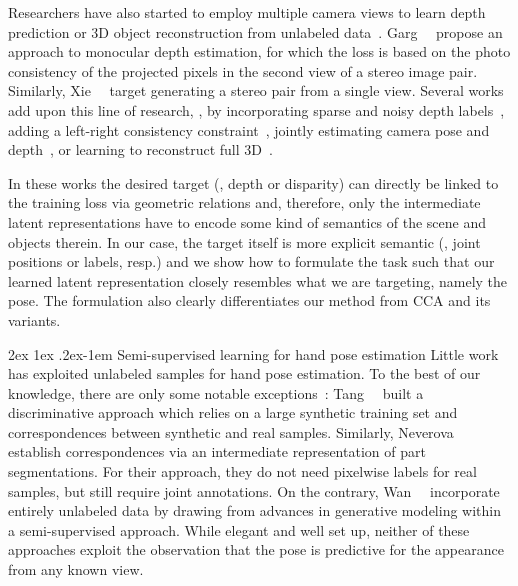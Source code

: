 \documentclass[10pt,twocolumn,letterpaper]{article}
\makeatletter
\renewcommand{\paragraph}{%
  \@startsection{paragraph}{4}%
  {\z@}{2ex \@plus 1ex \@minus .2ex}{-1em}%
  {\normalfont\normalsize\bfseries}%
}
\makeatother
\begin{document}
Researchers have also started to employ multiple camera views 
to learn depth prediction or 3D object reconstruction from unlabeled 
data~\cite{Garg2016eccv_unsuperviseddepth,Jayaraman2017arxiv_shapereconstruction,
Xie2016eccv_deep3d}.
Garg~\etal~\cite{Garg2016eccv_unsuperviseddepth} propose an approach 
to monocular depth estimation, for which the loss is based on the photo consistency 
of the projected pixels in the second view of a stereo image pair.
Similarly, Xie~\etal~\cite{Xie2016eccv_deep3d} target generating a stereo pair 
from a single view. %
Several works add upon this line of research, \eg, 
by incorporating sparse and noisy depth labels~\cite{Kuznietsov2017cvpr_semisuperviseddepth}, 
adding a left-right consistency 
constraint~\cite{Godard2017cvpr_unsuperviseddepthwithlrconsistency},
jointly estimating camera pose and depth~\cite{Zhou2017cvpr_unsupervised},
or learning to reconstruct full 
3D~\cite{Tatarchenko2016eccv_multiviewfromsingleimage,Tulsiani2017cvpr_monocularreconstruction,
Yang2015nips_recurrenttransformsfor3dviewsynth}.

In these works the desired target (\eg, depth or disparity) 
can directly be linked to the training loss via geometric relations
and, therefore, only the intermediate latent representations 
have to encode some kind of semantics of the scene and objects therein.
In our case, the target itself is more explicit semantic (\eg, joint positions or labels, resp.)
and we show how to formulate the task such that our learned latent representation 
closely resembles what we are targeting, namely the pose.
The formulation also clearly differentiates our method from \ac{CCA} and its variants.

\paragraph{Semi-supervised learning for hand pose estimation}
Little work has exploited unlabeled samples for hand pose estimation.
To the best of our knowledge, there are only some notable 
exceptions~\cite{Neverova2015arxiv,Tang2013iccv_semisupervisedhape,
Wan2017cvpr_crossingnets}:
Tang~\etal~\cite{Tang2013iccv_semisupervisedhape} built a discriminative approach
which relies on a large synthetic training set and 
correspondences between synthetic and real samples. 
Similarly, Neverova~\etal~\cite{Neverova2015arxiv} establish correspondences
via an intermediate representation of part segmentations.
For their approach, they do not need pixelwise labels for real samples,
but still require joint annotations.
On the contrary, Wan~\etal~\cite{Wan2017cvpr_crossingnets} incorporate
entirely unlabeled data by drawing from advances 
in generative modeling within a semi-supervised approach.
While elegant and well set up,
neither of these approaches exploit the observation that the pose is 
predictive for the appearance from any known view.
\end{document}
